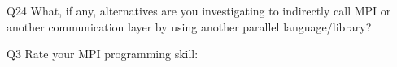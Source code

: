 \begin{description}%
\item{Q24} What, if any, alternatives are you investigating to indirectly call MPI or another communication layer by using another parallel language/library?%
\item{Q3} Rate your MPI programming skill:%
\end{description}%
